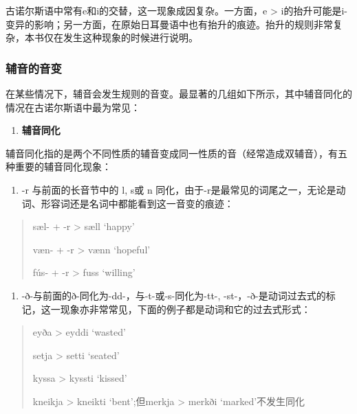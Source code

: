 古诺尔斯语中常有e和i的交替，这一现象成因复杂。一方面，e \textgreater{}
i的抬升可能是i-变异的影响；另一方面，在原始日耳曼语中也有抬升的痕迹。抬升的规则非常复杂，本书仅在发生这种现象的时候进行说明。

\subsubsection{辅音的音变}\label{ux8f85ux97f3ux7684ux97f3ux53d8}

在某些情况下，辅音会发生规则的音变。最显著的几组如下所示，其中辅音同化的情况在古诺尔斯语中最为常见：

\begin{enumerate}
  \def\labelenumi{\Alph{enumi}.}
  \item
        \label{_Ref117517666}{}\textbf{辅音同化}
\end{enumerate}

辅音同化指的是两个不同性质的辅音变成同一性质的音（经常造成双辅音），有五种重要的辅音同化现象：

\begin{enumerate}
  \def\labelenumi{(\alph{enumi})}
  \item
        \label{_Ref117517668}{}-r 与前面的长音节中的 l, s或 n
        同化，由于-r是最常见的词尾之一，无论是动词、形容词还是名词中都能看到这一音变的痕迹：
\end{enumerate}

\begin{quote}
  sæl- + -r \textgreater{} sæll `happy'

  væn- + -r \textgreater{} vænn `hopeful'

  fús- + -r \textgreater{} fuss `willing'
\end{quote}

\begin{enumerate}
  \def\labelenumi{(\alph{enumi})}
  \setcounter{enumi}{1}
  \item
        -ð-与前面的ð-同化为-dd-，与-t-或-s-同化为-tt-,
        -st-，-ð-是动词过去式的标记，这一现象亦非常常见，下面的例子都是动词和它的过去式形式：
\end{enumerate}

\begin{quote}
  eyða \textgreater{} eyddi `wasted'

  setja \textgreater{} setti `seated'

  kyssa \textgreater{} kyssti `kissed'

  kneikja \textgreater{} kneikti `bent';但merkja \textgreater{} merkði
  `marked'不发生同化
\end{quote}

